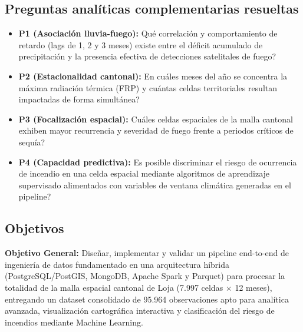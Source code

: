 \documentclass[11pt,a4paper]{article}
\begin{document}
\subsection{Preguntas anal\'iticas complementarias resueltas}
\begin{itemize}
    \item \textbf{P1 (Asociaci\'on lluvia-fuego):} \textquestiondown Qu\'e correlaci\'on y comportamiento de retardo (lags de 1, 2 y 3 meses) existe entre el d\'eficit acumulado de precipitaci\'on y la presencia efectiva de detecciones satelitales de fuego?
    \item \textbf{P2 (Estacionalidad cantonal):} \textquestiondown En cu\'ales meses del a\~no se concentra la m\'axima radiaci\'on t\'ermica (FRP) y cu\'antas celdas territoriales resultan impactadas de forma simult\'anea?
    \item \textbf{P3 (Focalizaci\'on espacial):} \textquestiondown Cu\'ales celdas espaciales de la malla cantonal exhiben mayor recurrencia y severidad de fuego frente a periodos cr\'iticos de sequ\'ia?
    \item \textbf{P4 (Capacidad predictiva):} \textquestiondown Es posible discriminar el riesgo de ocurrencia de incendio en una celda espacial mediante algoritmos de aprendizaje supervisado alimentados con variables de ventana clim\'atica generadas en el pipeline?
\end{itemize}

\subsection{Objetivos}
\textbf{Objetivo General:}
Dise\~nar, implementar y validar un pipeline end-to-end de ingenier\'ia de datos fundamentado en una arquitectura h\'ibrida (PostgreSQL/PostGIS, MongoDB, Apache Spark y Parquet) para procesar la totalidad de la malla espacial cantonal de Loja (7.997 celdas $\times$ 12 meses), entregando un dataset consolidado de 95.964 observaciones apto para anal\'itica avanzada, visualizaci\'on cartogr\'afica interactiva y clasificaci\'on del riesgo de incendios mediante Machine Learning.
\end{document}
